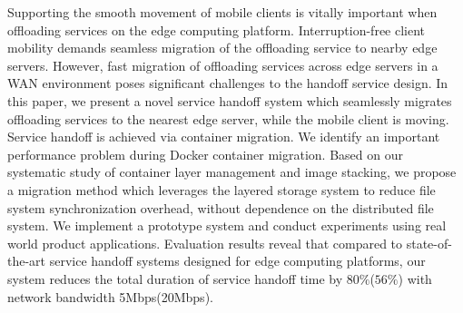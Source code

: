 
Supporting the smooth movement of mobile clients is vitally important when offloading services on the edge computing platform. Interruption-free client mobility demands seamless migration of the offloading service to nearby edge servers.
% 
However, fast migration of offloading services across edge servers in a WAN environment poses significant challenges to the handoff service design. 
%
%
%
In this paper, we present a novel service handoff system which seamlessly migrates offloading services to the nearest edge server, while the mobile client is moving. 
Service handoff is achieved via container migration. 
% 
We identify an important performance problem during Docker container migration.
%
Based on our systematic study of container layer management and image stacking,
we propose a migration method which leverages the layered storage system to reduce file system synchronization overhead, without dependence on the distributed file system. 
We implement a prototype system and conduct experiments using real world product applications.
Evaluation results reveal that compared to state-of-the-art service handoff systems designed for edge computing platforms, our system reduces the total duration of service handoff time by 
$80\%$($56\%$) with network bandwidth 5Mbps(20Mbps).







%
%
%

